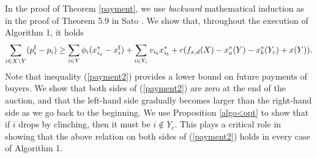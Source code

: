 \documentclass[letterpaper,11pt]{article}
\begin{document}
	In the proof of Theorem \ref{payment}, we use {\it backward} mathematical induction as in the proof of Theorem 5.9 in Sato \cite{S2023}. 
	We show that, throughout the execution of Algorithm 1, it holds
	\begin{equation}
	\label{payment2}
	\sum_{i\in X\setminus Y}(p^{\rm f}_i-p_i)\geq\sum_{i\in Y}\phi_{i}(x_{i_{a}}^*-x^{\rm f}_{i})+\sum_{i\in Y_c}v_{i_{b}}x_{i_{b}}^*+c(f_{x,d}(X)-x_a^*(Y)-x_b^*(Y_c)+x(Y)).
	\end{equation} 
	Note that inequality (\ref{payment2}) provides a lower bound on future payments of buyers. 
	We show that both sides of (\ref{payment2}) are zero at the end of the auction, and that the left-hand side gradually becomes larger than the 
	right-hand side as we go back to the beginning. 
	We use Proposition \ref{algo<opt} to show that if $i$ drops by clinching, then it must be $i\notin Y_c$.
	This plays a critical role in showing that the above relation on both sides of (\ref{payment2}) holds in every case of Algorithm 1.
	
\end{document}
